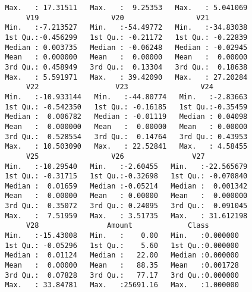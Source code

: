 \documentclass[
  11pt,
  letterpaper,
  DIV=11,
  numbers=noendperiod]{scrartcl}
\newenvironment{Shaded}{}{}
\newcommand{\CommentTok}[1]{\textcolor[rgb]{0.42,0.45,0.49}{#1}}
\newcommand{\DecValTok}[1]{\textcolor[rgb]{0.00,0.36,0.77}{#1}}
\newcommand{\FunctionTok}[1]{\textcolor[rgb]{0.44,0.26,0.76}{#1}}
\newcommand{\NormalTok}[1]{\textcolor[rgb]{0.14,0.16,0.18}{#1}}
\newcommand{\OtherTok}[1]{\textcolor[rgb]{0.44,0.26,0.76}{#1}}
\newcommand{\SpecialCharTok}[1]{\textcolor[rgb]{0.00,0.36,0.77}{#1}}
\newcommand{\StringTok}[1]{\textcolor[rgb]{0.01,0.18,0.38}{#1}}
\begin{document}
\begin{verbatim}
 Max.   : 17.31511   Max.   :  9.25353   Max.   : 5.041069  
      V19                 V20                 V21           
 Min.   :-7.213527   Min.   :-54.49772   Min.   :-34.83038  
 1st Qu.:-0.456299   1st Qu.: -0.21172   1st Qu.: -0.22839  
 Median : 0.003735   Median : -0.06248   Median : -0.02945  
 Mean   : 0.000000   Mean   :  0.00000   Mean   :  0.00000  
 3rd Qu.: 0.458949   3rd Qu.:  0.13304   3rd Qu.:  0.18638  
 Max.   : 5.591971   Max.   : 39.42090   Max.   : 27.20284  
      V22                  V23                 V24          
 Min.   :-10.933144   Min.   :-44.80774   Min.   :-2.83663  
 1st Qu.: -0.542350   1st Qu.: -0.16185   1st Qu.:-0.35459  
 Median :  0.006782   Median : -0.01119   Median : 0.04098  
 Mean   :  0.000000   Mean   :  0.00000   Mean   : 0.00000  
 3rd Qu.:  0.528554   3rd Qu.:  0.14764   3rd Qu.: 0.43953  
 Max.   : 10.503090   Max.   : 22.52841   Max.   : 4.58455  
      V25                 V26                V27            
 Min.   :-10.29540   Min.   :-2.60455   Min.   :-22.565679  
 1st Qu.: -0.31715   1st Qu.:-0.32698   1st Qu.: -0.070840  
 Median :  0.01659   Median :-0.05214   Median :  0.001342  
 Mean   :  0.00000   Mean   : 0.00000   Mean   :  0.000000  
 3rd Qu.:  0.35072   3rd Qu.: 0.24095   3rd Qu.:  0.091045  
 Max.   :  7.51959   Max.   : 3.51735   Max.   : 31.612198  
      V28                Amount             Class         
 Min.   :-15.43008   Min.   :    0.00   Min.   :0.000000  
 1st Qu.: -0.05296   1st Qu.:    5.60   1st Qu.:0.000000  
 Median :  0.01124   Median :   22.00   Median :0.000000  
 Mean   :  0.00000   Mean   :   88.35   Mean   :0.001728  
 3rd Qu.:  0.07828   3rd Qu.:   77.17   3rd Qu.:0.000000  
 Max.   : 33.84781   Max.   :25691.16   Max.   :1.000000  
\end{verbatim}

\begin{Shaded}
\end{Shaded}
\end{document}
